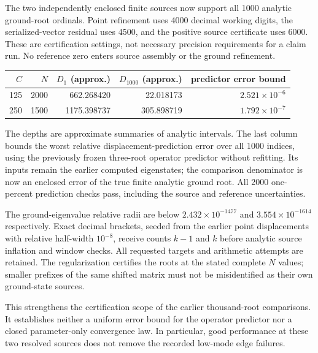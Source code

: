 The two independently enclosed finite sources now support all 1000
analytic ground-root ordinals. Point refinement uses 4000 decimal
working digits, the serialized-vector residual uses 4500, and the
positive source certificate uses 6000. These are certification settings,
not necessary precision requirements for a claim run. No reference
zero enters source assembly or the ground refinement.

\begin{center}
\begin{tabular}{rrrrr}
\toprule
$C$ & $N$ & $D_1$ (approx.) & $D_{1000}$ (approx.) & predictor error bound \\
\midrule
125 & 2000 & 662.268420 & 22.018173 & $2.521\times10^{-6}$ \\
250 & 1500 & 1175.398737 & 305.898719 & $1.792\times10^{-7}$ \\
\bottomrule
\end{tabular}
\end{center}
The depths are approximate summaries of analytic intervals.
The last column bounds the worst relative displacement-prediction
error over all 1000 indices, using the previously frozen three-root
operator predictor without refitting. Its inputs remain the earlier
computed eigenstates; the comparison denominator is now an enclosed
error of the true finite analytic ground root. All 2000 one-percent
prediction checks pass, including the source and reference uncertainties.

The ground-eigenvalue relative radii are below $2.432\times10^{-1477}$
and $3.554\times10^{-1614}$ respectively. Exact decimal brackets,
seeded from the earlier point displacements with relative half-width
$10^{-8}$, receive counts $k-1$ and $k$ before analytic source inflation
and window checks. All requested targets and arithmetic attempts are
retained. The regularization certifies the roots at the stated complete
$N$ values; smaller prefixes of the same shifted matrix must not be
misidentified as their own ground-state sources.

This strengthens the certification scope of the earlier thousand-root
comparisons. It establishes neither a uniform error bound for the
operator predictor nor a closed parameter-only convergence law. In
particular, good performance at these two resolved sources does not
remove the recorded low-mode edge failures.

